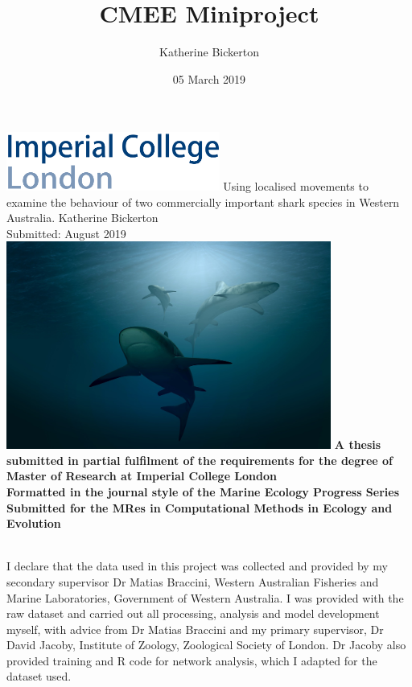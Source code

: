 \documentclass[11pt,a4paper]{article}
\title{CMEE Miniproject}
\date{05 March 2019}
\author{Katherine Bickerton}
\begin{document}
	
	\begin{titlepage}
		\centering
		\includegraphics[width = 7cm,left]{../Data/imperial_logo.png}
		{\Large
			\vskip2cm
			Using localised movements to examine the behaviour of two commercially important shark species in Western Australia.
		}    
		\vskip1cm	
		{\large Katherine Bickerton\\
		Submitted: August 2019}
		\vskip2cm	
		\includegraphics[width = 0.8\textwidth]{../Data/cover_image.jpg}
		\vskip4cm		
		\textbf{A thesis submitted in partial fulfilment of the requirements for the degree of Master of Research at Imperial College London\\
		Formatted in the journal style of the Marine Ecology Progress Series\\
		Submitted for the MRes in Computational Methods in Ecology and Evolution\\}
		\vspace*{\fill}
		\vspace*{\fill}
	\end{titlepage}
	
	
	\newpage
	
	\\
	
	\noindent
	I declare that the data used in this project was collected and provided by my secondary supervisor Dr Matias Braccini, Western Australian Fisheries and Marine Laboratories, Government of Western Australia. I was provided with the raw dataset and carried out all processing, analysis and model development myself, with advice from Dr Matias Braccini and my primary supervisor, Dr David Jacoby, Institute of Zoology, Zoological Society of London. Dr Jacoby also provided training and R code for network analysis, which I adapted for the dataset used.
	
\end{document}
